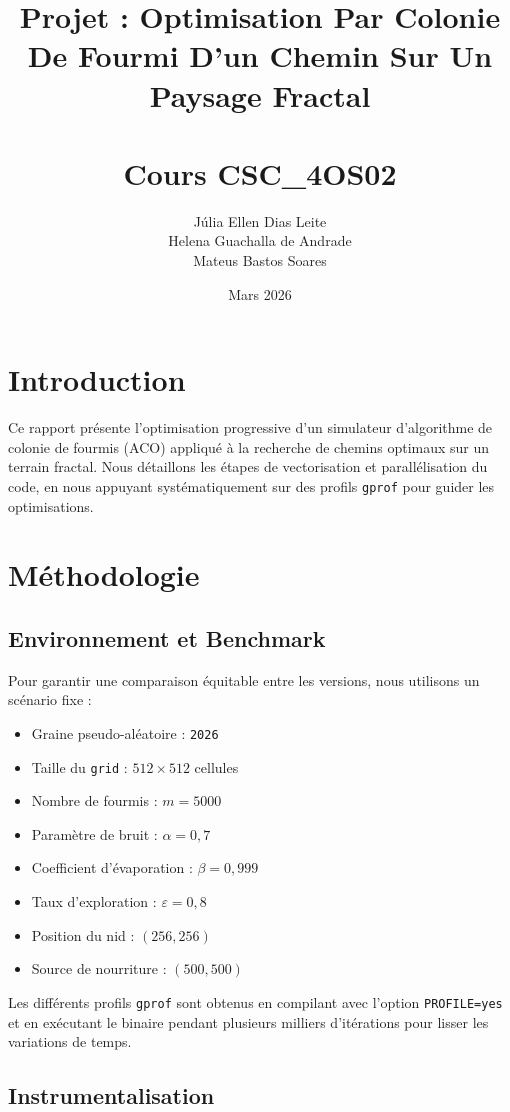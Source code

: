 \documentclass[12pt,a4paper]{article}
\title{Projet : Optimisation Par Colonie De Fourmi D'un Chemin Sur Un Paysage Fractal \\\\ \large Cours CSC\_4OS02}
\author{Júlia Ellen Dias Leite \\ Helena Guachalla de Andrade \\ Mateus Bastos Soares}
\date{Mars 2026}
\begin{document}
\maketitle

\tableofcontents
\newpage

\section{Introduction}
\label{sec:intro}

Ce rapport présente l'optimisation progressive d'un simulateur d'algorithme de colonie de fourmis (ACO) 
appliqué à la recherche de chemins optimaux sur un terrain fractal. Nous détaillons les étapes de 
vectorisation et parallélisation du code, en nous appuyant systématiquement sur des profils \texttt{gprof} pour guider les optimisations. 

\section{Méthodologie}
\label{sec:method}

\subsection{Environnement et Benchmark}

Pour garantir une comparaison équitable entre les versions, nous utilisons un scénario fixe :
\begin{itemize}
    \item Graine pseudo-aléatoire : \texttt{2026}
    \item Taille du \texttt{grid} : $512 \times 512$ cellules 
    \item Nombre de fourmis : $m = 5000$
    \item Paramètre de bruit : $\alpha = 0{,}7$
    \item Coefficient d'évaporation : $\beta = 0{,}999$
    \item Taux d'exploration : $\varepsilon = 0{,}8$
    \item Position du nid : $(256, 256)$ 
    \item Source de nourriture : $(500, 500)$
\end{itemize}

Les différents profils \texttt{gprof} sont obtenus en compilant avec l'option \texttt{PROFILE=yes} et en exécutant le binaire pendant plusieurs milliers d'itérations pour lisser les variations de temps.

\subsection{Instrumentalisation}
\end{document}

